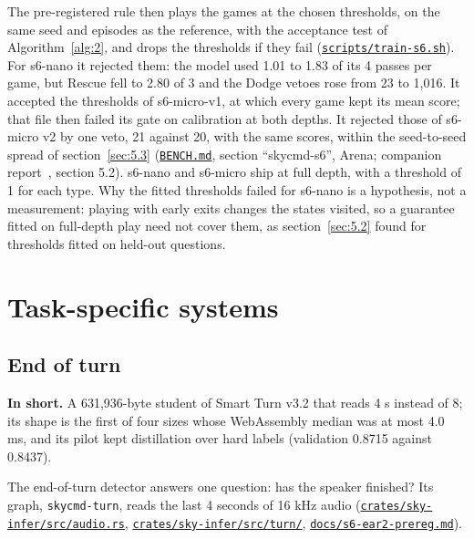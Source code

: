 \documentclass[10pt]{article}
\begin{document}
The pre-registered rule then plays the games at the chosen thresholds, on the same seed and episodes as the reference, with the acceptance test of Algorithm~\ref{alg:2}, and drops the thresholds if they fail (\href{https://github.com/maxgfr/skycmd/blob/main/scripts/train-s6.sh}{\texttt{scripts/\allowbreak{}train-s6.sh}}). For s6-nano it rejected them: the model used 1.01 to 1.83 of its 4 passes per game, but Rescue fell to 2.80 of 3 and the Dodge vetoes rose from 23 to 1,016. It accepted the thresholds of s6-micro-v1, at which every game kept its mean score; that file then failed its gate on calibration at both depths. It rejected those of s6-micro v2 by one veto, 21 against 20, with the same scores, within the seed-to-seed spread of section~\ref{sec:5.3} (\href{https://github.com/maxgfr/skycmd/blob/main/BENCH.md}{\texttt{BENCH.md}}, section ``skycmd-s6'', Arena; companion report~\cite{golfier2026skycmd}, section 5.2). s6-nano and s6-micro ship at full depth, with a threshold of 1 for each type. Why the fitted thresholds failed for s6-nano is a hypothesis, not a measurement: playing with early exits changes the states visited, so a guarantee fitted on full-depth play need not cover them, as section~\ref{sec:5.2} found for thresholds fitted on held-out questions.

\section{Task-specific systems}\label{sec:6}

\subsection{End of turn}\label{sec:6.1}

\textbf{In short.} A 631,936-byte student of Smart Turn v3.2 that reads 4 s instead of 8; its shape is the first of four sizes whose WebAssembly median was at most 4.0 ms, and its pilot kept distillation over hard labels (validation 0.8715 against 0.8437).

The end-of-turn detector answers one question: has the speaker finished? Its graph, \texttt{skycmd-turn}, reads the last 4 seconds of 16 kHz audio (\href{https://github.com/maxgfr/skycmd/blob/main/crates/sky-infer/src/audio.rs}{\texttt{crates/\allowbreak{}sky-infer/\allowbreak{}src/\allowbreak{}audio.rs}}, \href{https://github.com/maxgfr/skycmd/tree/main/crates/sky-infer/src/turn}{\texttt{crates/\allowbreak{}sky-infer/\allowbreak{}src/\allowbreak{}turn/\allowbreak{}}}, \href{https://github.com/maxgfr/skycmd/blob/main/docs/s6-ear2-prereg.md}{\texttt{docs/\allowbreak{}s6-ear2-prereg.md}}).
\end{document}
